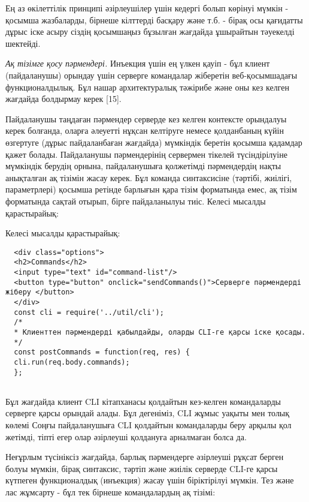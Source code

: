 \begin{multicols}{2}
Ең аз өкілеттілік принципі әзірлеушілер үшін кедергі болып көрінуі
мүмкін - қосымша жазбаларды, бірнеше кілттерді басқару және т.б. - бірақ
осы қағидатты дұрыс іске асыру сіздің қосымшаңыз бұзылған жағдайда
ұшырайтын тәуекелді шектейді.

\emph{Ақ тізімге қосу пәрмендері.} Инъекция үшін ең үлкен қауіп - бұл
клиент (пайдаланушы) орындау үшін серверге командалар жіберетін
веб-қосымшадағы функционалдылық. Бұл нашар архитектуралық тәжірибе және
оны кез келген жағдайда болдырмау керек {[}15{]}.

Пайдаланушы таңдаған пәрмендер серверде кез келген контексте орындалуы
керек болғанда, оларға әлеуетті нұқсан келтіруге немесе қолданбаның
күйін өзгертуге (дұрыс пайдаланбаған жағдайда) мүмкіндік беретін қосымша
қадамдар қажет болады. Пайдаланушы пәрмендерінің сервермен тікелей
түсіндірілуіне мүмкіндік берудің орнына, пайдаланушыға қолжетімді
пәрмендердің нақты анықталған ақ тізімін жасау керек. Бұл команда
синтаксисіне (тәртібі, жиілігі, параметрлері) қосымша ретінде барлығын
қара тізім форматында емес, ақ тізім форматында сақтай отырып, бірге
пайдаланылуы тиіс. Келесі мысалды қарастырайық:

Келесі мысалды қарастырайық:
\end{multicols}
\begin{verbatim}
  <div class="options">
  <h2>Commands</h2>
  <input type="text" id="command-list"/>
  <button type="button" onclick="sendCommands()">Серверге пәрмендерді жіберу </button>
  </div>
  const cli = require('../util/cli');
  /*
  * Клиенттен пәрмендерді қабылдайды, оларды CLI-ге қарсы іске қосады.
  */
  const postCommands = function(req, res) {
  cli.run(req.body.commands);
  };
  
\end{verbatim}
\begin{multicols}{2}

Бұл жағдайда клиент CLI кітапханасы қолдайтын кез-келген командаларды
серверге қарсы орындай алады. Бұл дегеніміз, CLI жұмыс уақыты мен толық
көлемі Соңғы пайдаланушыға CLI қолдайтын командаларды беру арқылы қол
жетімді, тіпті егер олар әзірлеуші қолдануға арналмаған болса да.

Неғұрлым түсініксіз жағдайда, барлық пәрмендерге әзірлеуші рұқсат берген
болуы мүмкін, бірақ синтаксис, тәртіп және жиілік серверде CLI-ге қарсы
күтпеген функционалдық (инъекция) жасау үшін біріктірілуі мүмкін. Тез
және лас жұмсарту - бұл тек бірнеше командалардың ақ тізімі:
\end{multicols}

